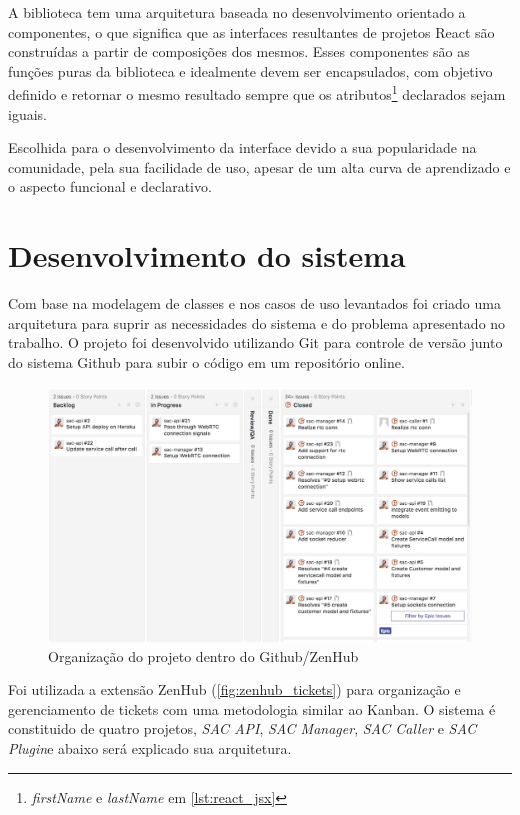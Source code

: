 A biblioteca tem uma arquitetura baseada no desenvolvimento orientado a componentes, o que significa que as interfaces resultantes de projetos React são construídas a partir de composições dos mesmos. Esses componentes são as funções puras da biblioteca e idealmente devem ser encapsulados, com objetivo definido e retornar o mesmo resultado sempre que os atributos\footnote{\textit{firstName} e \textit{lastName} em \ref{lst:react_jsx}} declarados sejam iguais.

Escolhida para o desenvolvimento da interface devido a sua popularidade na comunidade, pela sua facilidade de uso, apesar de um alta curva de aprendizado e o aspecto funcional e declarativo.

\section{Desenvolvimento do sistema}

Com base na modelagem de classes e nos casos de uso levantados foi criado uma arquitetura para suprir as necessidades do sistema e do problema apresentado no trabalho.
O projeto foi desenvolvido utilizando Git para controle de versão junto do sistema Github para subir o código em um repositório online. 

\begin{figure}[ht!]
	\centering
    \includegraphics[scale=0.35]{figures/zenhub-tickets.jpg} 
	\caption{Organização do projeto dentro do Github/ZenHub}
	\label{fig:zenhub_tickets}
\end{figure}

Foi utilizada a extensão ZenHub (\autoref{fig:zenhub_tickets}) para organização e gerenciamento de tickets com uma metodologia similar ao Kanban. O sistema é constituido de quatro projetos, \textit{SAC API}, \textit{SAC Manager}, \textit{SAC Caller} e \textit{SAC Plugin}e abaixo será explicado sua arquitetura.

